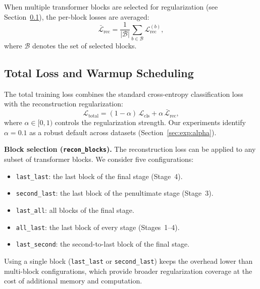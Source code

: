 \documentclass[review,12pt,authoryear]{elsarticle}
\begin{document}
When multiple transformer blocks are selected for regularization (see Section~\ref{sec:method:total}), the per-block losses are averaged:
\begin{equation}
    \bar{\mathcal{L}}_{\text{rec}} = \frac{1}{|\mathcal{B}|} \sum_{b \in \mathcal{B}} \mathcal{L}_{\text{rec}}^{(b)},
    \label{eq:rec_loss_avg}
\end{equation}
where $\mathcal{B}$ denotes the set of selected blocks.

\subsection{Total Loss and Warmup Scheduling}
\label{sec:method:total}

The total training loss combines the standard cross-entropy classification loss with the reconstruction regularization:
\begin{equation}
    \mathcal{L}_{\text{total}} = (1 - \alpha)\,\mathcal{L}_{\text{cls}} + \alpha\,\bar{\mathcal{L}}_{\text{rec}},
    \label{eq:total_loss}
\end{equation}
where $\alpha \in [0, 1)$ controls the regularization strength.
Our experiments identify $\alpha = 0.1$ as a robust default across datasets (Section~\ref{sec:exp:alpha}).

\textbf{Block selection (\texttt{recon\_blocks}).}
The reconstruction loss can be applied to any subset of transformer blocks.
We consider five configurations:
\begin{itemize}
    \item \texttt{last\_last}: the last block of the final stage (Stage~4).
    \item \texttt{second\_last}: the last block of the penultimate stage (Stage~3).
    \item \texttt{last\_all}: all blocks of the final stage.
    \item \texttt{all\_last}: the last block of every stage (Stages~1--4).
    \item \texttt{last\_second}: the second-to-last block of the final stage.
\end{itemize}
Using a single block (\texttt{last\_last} or \texttt{second\_last}) keeps the overhead lower than multi-block configurations, which provide broader regularization coverage at the cost of additional memory and computation.
\end{document}
